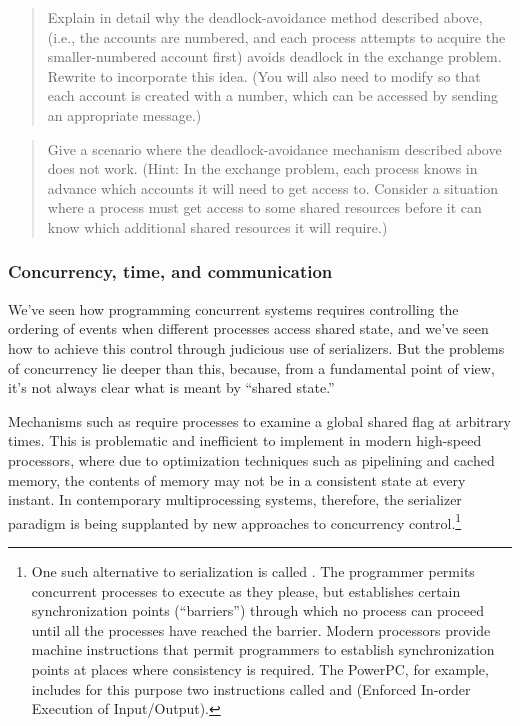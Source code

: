 \begin{quote}
 Explain in detail why the
deadlock-avoidance method described above, (i.e., the accounts are numbered,
and each process attempts to acquire the smaller-numbered account first) avoids
deadlock in the exchange problem.  Re\-write  to
incorporate this idea.  (You will also need to modify  so
that each account is created with a number, which can be accessed by sending an
appropriate message.)
\end{quote}

\begin{quote}
 Give a scenario where the
deadlock-avoid\-ance mechanism described above does not work.  (Hint: In the
exchange problem, each process knows in advance which accounts it will need to
get access to.  Consider a situation where a process must get access to some
shared resources before it can know which additional shared resources it will
require.)
\end{quote}

\subsubsection*{Concurrency, time, and communication}

We've seen how programming concurrent systems requires controlling the ordering
of events when different processes access shared state, and we've seen how to
achieve this control through judicious use of serializers.  But the problems of
concurrency lie deeper than this, because, from a fundamental point of view,
it's not always clear what is meant by ``shared state.''

Mechanisms such as  require processes to examine a global
shared flag at arbitrary times.  This is problematic and inefficient to
implement in modern high-speed processors, where due to optimization techniques
such as pipelining and cached memory, the contents of memory may not be in a
consistent state at every instant.  In contemporary multiprocessing systems,
therefore, the serializer paradigm is being supplanted by new approaches to
concurrency control.\footnote{One such alternative to serialization is called
.  The programmer permits concurrent processes
to execute as they please, but establishes certain synchronization points
(``barriers'') through which no process can proceed until all the processes
have reached the barrier.  Modern processors provide machine instructions that
permit programmers to establish synchronization points at places where
consistency is required.  The PowerPC, for example, includes for
this purpose two instructions called  and 
(Enforced In-order Execution of Input/Output).}

